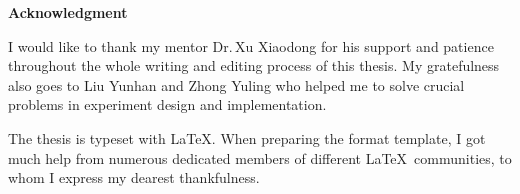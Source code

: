 
\clearpage
\thispagestyle{plain}
{}

\centerline{\bfseries Acknowledgment}

\linespread{1.4}
\bigskip

I would like to thank my mentor Dr.\,Xu Xiaodong for his support and patience throughout the whole writing and editing process of this thesis. My gratefulness also goes to Liu Yunhan and Zhong Yuling who helped me to solve crucial problems in experiment design and implementation.

The thesis is typeset with \LaTeX. When preparing the format template, I got much help from numerous dedicated members of different \LaTeX\ communities, to whom I express my dearest thankfulness.